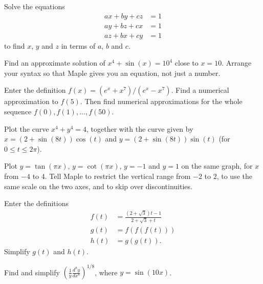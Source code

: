 \documentclass[a4paper,10pt]{amsbook}
\numberwithin{example}{chapter}
\begin{document}
\begin{exercise}
 Solve the equations
 \begin{align*}
  ax+by+cz &= 1 \\
  ay+bz+cx &= 1 \\
  az+bx+cy &= 1
 \end{align*}
 to find $x$, $y$ and $z$ in terms of $a$, $b$ and $c$.
\end{exercise}

\begin{exercise}
 Find an approximate solution of $x^4+\sin(x)=10^4$ close
 to $x=10$.  Arrange your syntax so that Maple gives you an
 equation, not just a number.
\end{exercise}

\begin{exercise}
 Enter the definition $f(x)=(e^x+x^7)/(e^x-x^7)$.  Find
 a numerical approximation to $f(5)$.  Then find numerical
 approximations for the whole sequence
 $f(0),f(1),\dotsc,f(50)$. 
\end{exercise}

\begin{exercise}
 Plot the curve $x^4+y^4=4$, together with the curve given
 by $x=(2+\sin(8t))\cos(t)$ and $y=(2+\sin(8t))\sin(t)$ (for
 $0\leq t\leq 2\pi$).
\end{exercise}

\begin{exercise}
 Plot $y=\tan(\pi x)$, $y=\cot(\pi x)$, $y=-1$ and $y=1$ on
 the same graph, for $x$ from $-4$ to $4$.  Tell Maple to
 restrict the vertical range from $-2$ to $2$, to use the
 same scale on the two axes, and to skip over
 discontinuities.
\end{exercise}

\begin{exercise}
 Enter the definitions
 \begin{align*}
  f(t) &= \frac{(2+\sqrt{3})t-1}{2+\sqrt{3}+t} \\
  g(t) &= f(f(f(t))) \\
  h(t) &= g(g(t)).
 \end{align*}
 Simplify $g(t)$ and $h(t)$.
\end{exercise}

\begin{exercise}
 Find and simplify $\displaystyle
 \left(\frac{1}{y}\frac{d^8y}{dx^8}\right)^{1/8}$, where
 $y=\sin(10x)$. 
\end{exercise}

\end{document}
